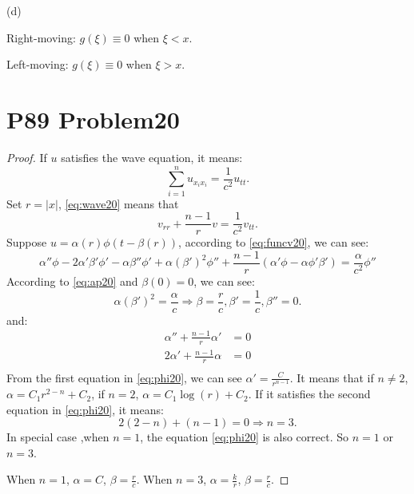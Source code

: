 \documentclass[a4paper]{ctexart}
\begin{document}
(d)

Right-moving: $g(\xi)\equiv 0$ when $\xi<x$.

Left-moving: $g(\xi)\equiv 0$ when $\xi>x$. 
\section*{P89 Problem20}
\begin{proof}
    If $u$ satisfies the wave equation, it means:
    \begin{equation}
        \label{eq:wave20}
        \sum_{i=1}^{n}u_{x_{i}x_{i}}=\frac{1}{c^{2}}u_{tt}.
    \end{equation}
    Set $r=|x|$, \ref{eq:wave20} means that 
    \begin{equation}
        \label{eq:funcv20}
        v_{rr}+\frac{n-1}{r}v=\frac{1}{c^{2}}v_{tt}.
    \end{equation}
    Suppose $u=\alpha(r)\phi(t-\beta(r))$, according to \ref{eq:funcv20}, we can see:
    \begin{equation}
        \label{eq:ap20}
        \alpha''\phi-2\alpha'\beta'\phi'-\alpha\beta''\phi'+\alpha(\beta')^{2}\phi''+\frac{n-1}{r}(\alpha'\phi-\alpha\phi'\beta')=\frac{\alpha}{c^{2}}\phi''
    \end{equation}
    According to \ref{eq:ap20} and $\beta(0)=0$, we can see:
    \begin{equation}
        \label{eq:2phi20}
        \alpha(\beta')^{2}=\frac{\alpha}{c}\Rightarrow \beta=\frac{r}{c},\beta'=\frac{1}{c},\beta''=0.
    \end{equation}
    and:
    \begin{equation}
        \label{eq:phi20}
        \begin{aligned}
            \alpha''+\frac{n-1}{r}\alpha'&=0\\
            2\alpha'+\frac{n-1}{r}\alpha&=0\\
        \end{aligned}
    \end{equation}
    From the first equation in \ref{eq:phi20}, we can see $\alpha'=\frac{C}{r^{n-1}}$. It means that if $n\neq 2$, 
    $\alpha=C_{1}r^{2-n}+C_{2}$, if $n=2$, $\alpha=C_{1}\log(r)+C_{2}$.
    If it satisfies the second equation in \ref{eq:phi20}, it means:
    \begin{equation}
        \label{eq:alpha20}
        2(2-n)+(n-1)=0\Rightarrow n=3.
    \end{equation}
    In special case ,when $n=1$, the equation \ref{eq:phi20} is also correct. So $n=1$ or $n=3$.

    When $n=1$, $\alpha=C$, $\beta=\frac{r}{c}$. When $n=3$, $\alpha=\frac{k}{r}$, $\beta=\frac{r}{c}$.
\end{proof}
\end{document}
